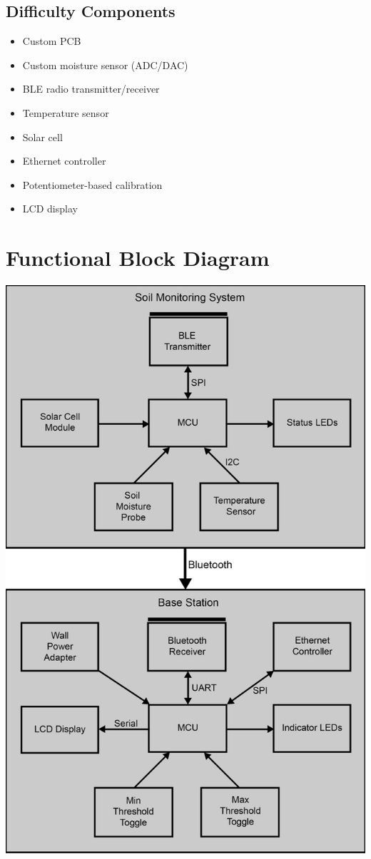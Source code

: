\documentclass{article}
\begin{document}
\subsection{Difficulty Components}
\begin{itemize}
    \item Custom PCB
    \item Custom moisture sensor (ADC/DAC)
    \item BLE radio transmitter/receiver
    \item Temperature sensor
    \item Solar cell
	\item Ethernet controller
	\item Potentiometer-based calibration
	\item LCD display
\end{itemize}

\section{Functional Block Diagram}
\begin{center}
    \includegraphics[height=0.9\textheight]{functional_diagram.png}
\end{center}
\end{document}
